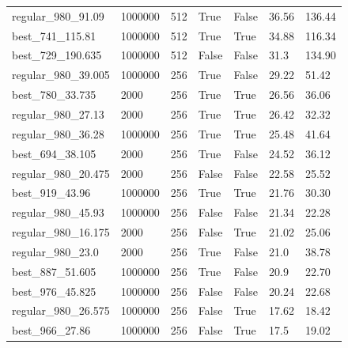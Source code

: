 \documentclass[12pt,a4paper, onecolumn]{exam}
\begin{document}
\begin{appendices}
\begin{table}[H]
\begin{tabular}{|l|l|l|l|l|l|l|}
            regular\_980\_91.09  & 1000000             & 512                          & True  & False & 36.56 & 136.44 \\
            best\_741\_115.81    & 1000000             & 512                          & True  & True  & 34.88 & 116.34 \\
            best\_729\_190.635   & 1000000             & 512                          & False & False & 31.3  & 134.90 \\
            regular\_980\_39.005 & 1000000             & 256                          & True  & False & 29.22 & 51.42  \\
            best\_780\_33.735    & 2000                & 256                          & True  & True  & 26.56 & 36.06  \\
            regular\_980\_27.13  & 2000                & 256                          & True  & True  & 26.42 & 32.32  \\
            regular\_980\_36.28  & 1000000             & 256                          & True  & True  & 25.48 & 41.64  \\
            best\_694\_38.105    & 2000                & 256                          & True  & False & 24.52 & 36.12  \\
            regular\_980\_20.475 & 2000                & 256                          & False & False & 22.58 & 25.52  \\
            best\_919\_43.96     & 1000000             & 256                          & True  & True  & 21.76 & 30.30  \\
            regular\_980\_45.93  & 1000000             & 256                          & False & False & 21.34 & 22.28  \\
            regular\_980\_16.175 & 2000                & 256                          & False & True  & 21.02 & 25.06  \\
            regular\_980\_23.0   & 2000                & 256                          & True  & False & 21.0  & 38.78  \\
            best\_887\_51.605    & 1000000             & 256                          & True  & False & 20.9  & 22.70  \\
            best\_976\_45.825    & 1000000             & 256                          & False & False & 20.24 & 22.68  \\
            regular\_980\_26.575 & 1000000             & 256                          & False & True  & 17.62 & 18.42  \\
            best\_966\_27.86     & 1000000             & 256                          & False & True  & 17.5  & 19.02  \\

\end{tabular}
\end{table}
\end{appendices}
\end{document}
